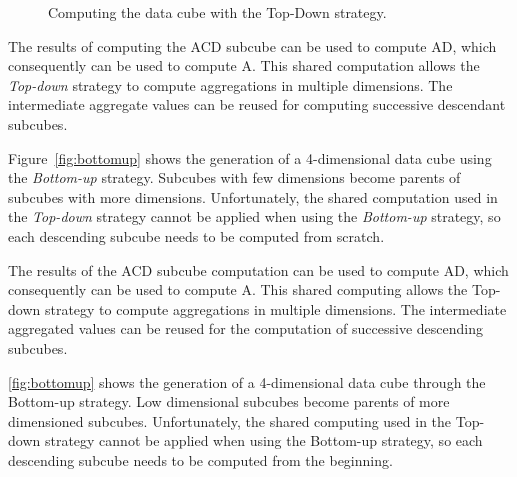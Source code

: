 \begin{figure}[!hbt]
  \caption{Computing the data cube with the Top-Down strategy.}\label{fig:topdown}
  \vspace{4mm}
  \begin{center}
  \end{center}
  \vspace{2mm}
  \legenda{}
\end{figure}

The results of computing the ACD subcube can be used to compute AD, which consequently can be used to compute A.
This shared computation allows the \textit{Top-down} strategy to compute aggregations in multiple dimensions.
The intermediate aggregate values can be reused for computing successive descendant subcubes.

Figure~\ref{fig:bottomup} shows the generation of a 4-dimensional data cube using the \textit{Bottom-up} strategy.
Subcubes with few dimensions become parents of subcubes with more dimensions.
Unfortunately, the shared computation used in the \textit{Top-down} strategy cannot be applied when using the \textit{Bottom-up} strategy, so each descending subcube needs to be computed from scratch.

The results of the ACD subcube computation can be used to compute AD, which consequently can be used to compute A.
This shared computing allows the Top-down strategy to compute aggregations in multiple dimensions.
The intermediate aggregated values can be reused for the computation of successive descending subcubes.

\autoref{fig:bottomup} shows the generation of a 4-dimensional data cube through the Bottom-up strategy.
Low dimensional subcubes become parents of more dimensioned subcubes.
Unfortunately, the shared computing used in the Top-down strategy cannot be applied when using the Bottom-up strategy, so each descending subcube needs to be computed from the beginning.

